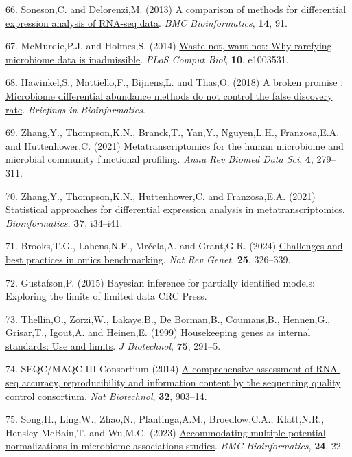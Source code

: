 \documentclass[
]{article}
\newlength{\cslhangindent}
\newenvironment{CSLReferences}[2] %
 {\begin{list}{}{%
  \setlength{\itemindent}{0pt}
  \setlength{\leftmargin}{0pt}
  \setlength{\parsep}{0pt}
  \ifodd #1
   \setlength{\leftmargin}{\cslhangindent}
   \setlength{\itemindent}{-1\cslhangindent}
  \fi
  \setlength{\itemsep}{#2\baselineskip}}}
 {\end{list}}
\begin{document}
\begin{CSLReferences}{1}{1}
66. Soneson,C. and Delorenzi,M. (2013)
\href{https://doi.org/10.1186/1471-2105-14-91}{A comparison of methods
for differential expression analysis of {RNA-seq} data}. \emph{BMC
Bioinformatics}, \textbf{14}, 91.

67. McMurdie,P.J. and Holmes,S. (2014)
\href{https://doi.org/10.1371/journal.pcbi.1003531}{Waste not, want not:
Why rarefying microbiome data is inadmissible}. \emph{PLoS Comput Biol},
\textbf{10}, e1003531.

68. Hawinkel,S., Mattiello,F., Bijnens,L. and Thas,O. (2018)
\href{http://dx.doi.org/10.1093/bib/bbx104}{A broken promise :
Microbiome differential abundance methods do not control the false
discovery rate}. \emph{Briefings in Bioinformatics}.

69. Zhang,Y., Thompson,K.N., Branck,T., Yan,Y., Nguyen,L.H.,
Franzosa,E.A. and Huttenhower,C. (2021)
\href{https://doi.org/10.1146/annurev-biodatasci-031121-103035}{Metatranscriptomics
for the human microbiome and microbial community functional profiling}.
\emph{Annu Rev Biomed Data Sci}, \textbf{4}, 279--311.

70. Zhang,Y., Thompson,K.N., Huttenhower,C. and Franzosa,E.A. (2021)
\href{https://doi.org/10.1093/bioinformatics/btab327}{Statistical
approaches for differential expression analysis in metatranscriptomics}.
\emph{Bioinformatics}, \textbf{37}, i34--i41.

71. Brooks,T.G., Lahens,N.F., Mrčela,A. and Grant,G.R. (2024)
\href{https://doi.org/10.1038/s41576-023-00679-6}{Challenges and best
practices in omics benchmarking}. \emph{Nat Rev Genet}, \textbf{25},
326--339.

72. Gustafson,P. (2015) Bayesian inference for partially identified
models: Exploring the limits of limited data CRC Press.

73. Thellin,O., Zorzi,W., Lakaye,B., De Borman,B., Coumans,B.,
Hennen,G., Grisar,T., Igout,A. and Heinen,E. (1999)
\href{https://www.ncbi.nlm.nih.gov/pubmed/10617337}{Housekeeping genes
as internal standards: Use and limits}. \emph{J Biotechnol},
\textbf{75}, 291--5.

74. SEQC/MAQC-III Consortium (2014)
\href{https://doi.org/10.1038/nbt.2957}{A comprehensive assessment of
RNA-seq accuracy, reproducibility and information content by the
sequencing quality control consortium}. \emph{Nat Biotechnol},
\textbf{32}, 903--14.

75. Song,H., Ling,W., Zhao,N., Plantinga,A.M., Broedlow,C.A.,
Klatt,N.R., Hensley-McBain,T. and Wu,M.C. (2023)
\href{https://doi.org/10.1186/s12859-023-05147-w}{Accommodating multiple
potential normalizations in microbiome associations studies}. \emph{BMC
Bioinformatics}, \textbf{24}, 22.

\end{CSLReferences}
\end{document}
